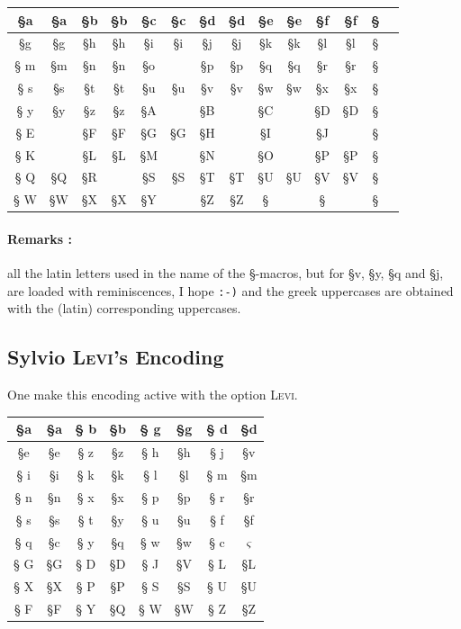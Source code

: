 \documentclass[full, english]{l3doc}
\newcommand\Option[1]{\textsc{#1}}
\begin{document}
\vspace{2\baselineskip}

\begin{center}\Large
\begin{ParesseActive} \label{codageorig}
\begin{tabular}{*7{||>{\ttfamily \S}c|c}||}\hline
a&§a&b&§b&c&§c&d&§d&e&§e&f&§f\\ \hline
g&§g&h&§h&i&§i&j&§j&k&§k&l&§l\\ \hline
m&§m&n&§n&o&  &p&§p&q&§q&r&§r\\ \hline
s&§s&t&§t&u&§u&v&§v&w&§w&x&§x\\ \hline
y&§y&z&§z&A&  &B&  &C&  &D&§D\\ \hline
E&  &F&§F&G&§G&H&  &I&  &J&  \\ \hline
K&  &L&§L&M&  &N&  &O&  &P&§P\\ \hline
Q&§Q&R&  &S&§S&T&§T&U&§U&V&§V\\ \hline
W&§W&X&§X&Y&  &Z&§Z&\\ \hline
\end{tabular}
\end{ParesseActive}
\end{center}

\paragraph{Remarks : } all the latin letters used in the name of the
§-macros, but for {\ActiveLaParesse §v, §y, §q and §j}, are loaded with
reminiscences, I hope \texttt{:-)} and the greek uppercases are
obtained with the (latin) corresponding uppercases.

\pagebreak[4]

\subsection{Sylvio \textsc{Levi}'s Encoding}

One make this encoding active with the option \Option{Levi}.

\begin{center}\Large
\begin{ParesseActive} \label{codagelevi}
\begin{tabular}{*4{||>{\ttfamily \S}c|c}||}\hline
a & §a & b & §b & g & §g & d & §d\\ \hline
e & §e & z & §z & h & §h & j & §v\\ \hline
i & §i & k & §k & l & §l & m & §m\\ \hline
n & §n & x & §x & p & §p & r & §r\\ \hline
s & §s & t & §y & u & §u & f & §f\\ \hline
q & §c & y & §q & w & §w & c & \(\varsigma\)\\ \hline\hline
G & §G & D & §D & J & §V & L & §L\\ \hline
X & §X & P & §P & S & §S & U & §U\\ \hline
F & §F & Y & §Q & W & §W & Z & §Z\\ \hline
\end{tabular}
\end{ParesseActive}
\end{center}
\end{document}
